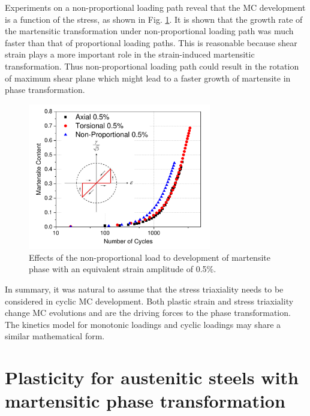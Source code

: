 \documentclass[preprint,5p,twocolumn,10pt,sort&compress]{elsarticle}
\begin{document}
Experiments on a non-proportional loading path reveal that the MC development is a function of the stress, as shown in
Fig. \ref{fig:non-proportional and path}.
It is shown that the growth rate of the martensitic transformation under non-proportional loading path was much faster than that of proportional loading paths. This is reasonable because shear strain plays a more important role in the strain-induced martensitic transformation. Thus non-proportional loading path could result in the rotation of maximum shear plane which might lead to a faster growth of martensite in phase transformation.

\begin{figure}[!h]
  \begin{center}
  \includegraphics[width=8cm]{non-proportional2andpath.pdf}
  \caption{Effects of the non-proportional load to development of martensite phase with an equivalent strain amplitude of 0.5\%.}
  \label{fig:non-proportional and path}
  \end{center}
\end{figure}

In summary, it was natural to assume that the stress triaxiality needs to be considered in cyclic MC development. Both plastic strain and stress triaxiality change MC evolutions and are the driving forces to the phase transformation. The kinetics model for monotonic loadings  and cyclic loadings may share a similar mathematical form.


\section{Plasticity for austenitic steels with martensitic phase transformation}
\end{document}
